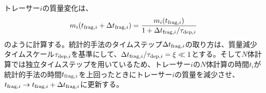 \documentclass[a4paper,10pt,oneside,twocolumn,notitlepage,final]{jarticle}
\begin{document}
トレーサー$i$の質量変化は、
\begin{align}
 m_i(t_{{\rm frag},i} + \Delta t_{{\rm frag},i}) = \frac{m_i(t_{{\rm frag},i})}{1 + \Delta t_{{\rm frag},i}/\tau_{{\rm dep},i}}
\end{align}
のように計算する。統計的手法のタイムステップ$\Delta t_{{\rm frag},i}$の取り方は、質量減少タイムスケール$\tau_{{\rm dep},i}$を基準にして、$\Delta t_{{\rm frag},i}/\tau_{{\rm dep},i} = \xi \ll 1$とする。そして$N$体計算では独立タイムステップを用いているため、トレーサー$i$の$N$体計算の時間$t_i$が統計的手法の時間$t_{{\rm frag},i}$を上回ったときにトレーサー$i$の質量を減少させ、$t_{{\rm frag},i} \to t_{{\rm frag},i} + \Delta t_{{\rm frag},i}$に更新する。



\end{document}
